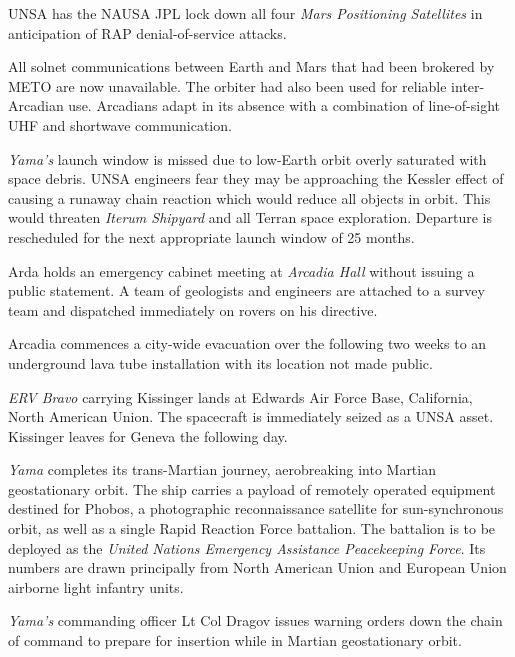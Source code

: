 UNSA has the NAUSA JPL lock down all four {\it Mars Positioning Satellites} in anticipation of RAP denial-of-service attacks.

All solnet communications between Earth and Mars that had been brokered by METO are now unavailable. The orbiter had also been used for reliable inter-Arcadian use. Arcadians adapt in its absence with a combination of line-of-sight UHF and shortwave communication.
\StopTimelineDate

{\it Yama's} launch window is missed due to low-Earth orbit overly saturated with space debris. UNSA engineers fear they may be approaching the Kessler effect of causing a runaway chain reaction which would reduce all objects in orbit. This would threaten {\it Iterum Shipyard} and all Terran space exploration. Departure is rescheduled for the next appropriate launch window of 25 months.
\StopTimelineDate

Arda holds an emergency cabinet meeting at {\it Arcadia Hall} without issuing a public statement. A team of geologists and engineers are attached to a survey team and dispatched immediately on rovers on his directive.
\StopTimelineDate

Arcadia commences a city-wide evacuation over the following two weeks to an underground lava tube installation with its location not made public.
\StopTimelineDate

{\it ERV Bravo} carrying Kissinger lands at Edwards Air Force Base, California, North American Union. The spacecraft is immediately seized as a UNSA asset. Kissinger leaves for Geneva the following day.
\StopTimelineDate

{\it Yama} completes its trans-Martian journey, aerobreaking into Martian geostationary orbit. The ship carries a payload of remotely operated equipment destined for Phobos, a photographic reconnaissance satellite for sun-synchronous orbit, as well as a single Rapid Reaction Force battalion. The battalion is to be deployed as the {\it United Nations Emergency Assistance Peacekeeping Force}. Its numbers are drawn principally from North American Union and European Union airborne light infantry units.
\StopTimelineDate

{\it Yama's} commanding officer Lt Col Dragov issues warning orders down the chain of command to prepare for insertion while in Martian geostationary orbit.
\StopTimelineDate

